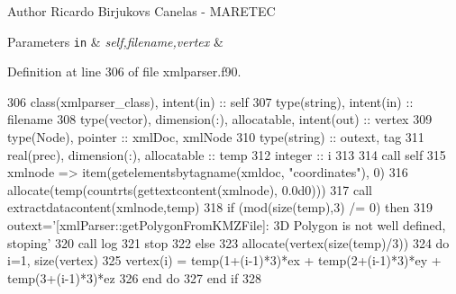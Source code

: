 \begin{DoxyAuthor}{Author}
Ricardo Birjukovs Canelas -\/ M\+A\+R\+E\+T\+EC 
\end{DoxyAuthor}

\begin{DoxyParams}[1]{Parameters}
\mbox{\tt in}  & {\em self,filename,vertex} & \\
\hline
\end{DoxyParams}


Definition at line 306 of file xmlparser.\+f90.


\begin{DoxyCode}
306     \textcolor{keywordtype}{class}(xmlparser\_class), \textcolor{keywordtype}{intent(in)} :: self
307     \textcolor{keywordtype}{type}(string), \textcolor{keywordtype}{intent(in)} :: filename
308     \textcolor{keywordtype}{type}(vector), \textcolor{keywordtype}{dimension(:)}, \textcolor{keywordtype}{allocatable}, \textcolor{keywordtype}{intent(out)} :: vertex
309     \textcolor{keywordtype}{type}(Node), \textcolor{keywordtype}{pointer} :: xmlDoc, xmlNode
310     \textcolor{keywordtype}{type}(string) :: outext, tag
311     \textcolor{keywordtype}{real(prec)}, \textcolor{keywordtype}{dimension(:)}, \textcolor{keywordtype}{allocatable} :: temp
312     \textcolor{keywordtype}{integer} :: i
313 
314     \textcolor{keyword}{call }self%
315     xmlnode => item(getelementsbytagname(xmldoc, \textcolor{stringliteral}{"coordinates"}), 0)
316     \textcolor{keyword}{allocate}(temp(countrts(gettextcontent(xmlnode), 0.0d0)))
317     \textcolor{keyword}{call }extractdatacontent(xmlnode,temp)
318     \textcolor{keywordflow}{if} (mod(\textcolor{keyword}{size}(temp),3) /= 0) \textcolor{keywordflow}{then}
319         outext=\textcolor{stringliteral}{'[xmlParser::getPolygonFromKMZFile]: 3D Polygon is not well defined, stoping'}
320         \textcolor{keyword}{call }log%
321         stop
322     \textcolor{keywordflow}{else}
323         \textcolor{keyword}{allocate}(vertex(\textcolor{keyword}{size}(temp)/3))
324         \textcolor{keywordflow}{do} i=1, \textcolor{keyword}{size}(vertex)
325             vertex(i) = temp(1+(i-1)*3)*ex + temp(2+(i-1)*3)*ey + temp(3+(i-1)*3)*ez
326 \textcolor{keywordflow}{        end do}
327 \textcolor{keywordflow}{    end if}    
328 
\end{DoxyCode}
\mbox{\label{namespacexmlparser__mod_acd860c3d06a25fc422edbcc3d356d976}} 
